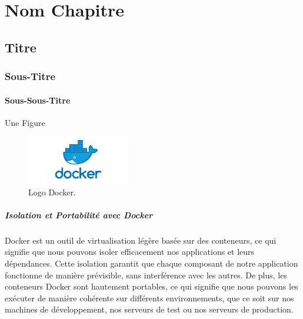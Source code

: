 \chapter{Nom Chapitre}
\section{Titre}
    \subsection{Sous-Titre}
        \subsubsection{Sous-Sous-Titre}
            


Une Figure
\begin{figure}[h]
  \centering
  \includegraphics[width=0.4\textwidth]{figures/dockerlogo.png}
  \caption{Logo Docker.}
  \label{fig:docker}
\end{figure}

\paragraph{Isolation et Portabilité avec Docker} %
Docker est un outil de virtualisation légère basée sur des conteneurs, ce qui signifie que nous pouvons isoler efficacement nos applications et leurs dépendances. Cette isolation garantit que chaque composant de notre application fonctionne de manière prévisible, sans interférence avec les autres. De plus, les conteneurs Docker sont hautement portables, ce qui signifie que nous pouvons les exécuter de manière cohérente sur différents environnements, que ce soit sur nos machines de développement, nos serveurs de test ou nos serveurs de production.


